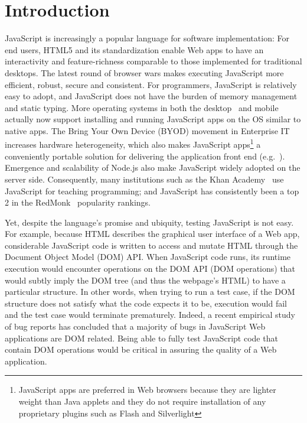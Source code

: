 \section{Introduction}
JavaScript is increasingly a popular language for software implementation: %
For end users, HTML5 and its standardization enable Web apps to have an interactivity and feature-richness comparable to those implemented for traditional desktops.  
The latest round of browser wars makes executing JavaScript more efficient, robust, secure and consistent.  
For programmers, JavaScript is relatively easy to adopt, and JavaScript does not have the burden of memory management and static typing.
More operating systems in both the desktop~\cite{chromeApps, windows8javascript} and mobile~\cite{apacheCordova, iosWebView, blackberryWebWorks, firefoxOS, androidWebView, tizen} actually now support installing and running JavaScript apps on the OS similar to native apps.
The Bring Your Own Device (BYOD) movement in Enterprise IT increases hardware heterogeneity, 
which also makes JavaScript apps\footnote{JavaScript apps are preferred in Web browsers because they are lighter weight than Java applets and they do not require installation of any proprietary plugins such as Flash and Silverlight} 
a conveniently portable solution for delivering the application front end (e.g.~\cite{BNSFoffice365}).
Emergence and scalability of Node.js also make JavaScript widely adopted on the server side.  
Consequently, many institutions such as the Khan Academy~\cite{khanAcademy} use JavaScript for teaching programming; and JavaScript has consistently been a top 2 in the RedMonk~\cite{redmonk} popularity rankings.%

Yet, despite the language's promise and ubiquity, testing JavaScript is not easy.  
For example, because HTML describes the graphical user interface of a Web app, considerable JavaScript code is written to access and mutate HTML through the Document Object Model (DOM) API.  
When JavaScript code runs, its runtime execution would encounter operations on the DOM API (DOM operations) that would subtly imply the DOM tree (and thus the webpage's HTML) to have a particular structure.  
In other words, when trying to run a test case, if the DOM structure does not satisfy what the code expects it to be, execution would fail and the test case would terminate prematurely.  
Indeed, a recent empirical study~\cite{frolin2013} of bug reports has concluded that a majority of bugs in JavaScript Web applications are DOM related.  
Being able to fully test JavaScript code that contain DOM operations would be critical in assuring the quality of a Web application.  


